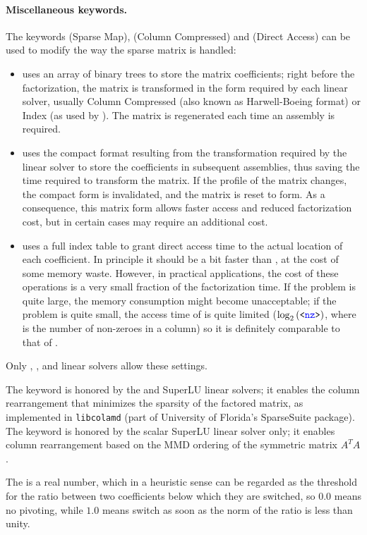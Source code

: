 \paragraph{Miscellaneous keywords.}
The keywords  (Sparse Map),  (Column Compressed)
and  (Direct Access) can be used to modify the way
the sparse matrix is handled:
\begin{itemize}
\item {} uses an array of binary trees to store the matrix
coefficients; right before the factorization, the matrix is transformed
in the form required by each linear solver, usually Column Compressed
(also known as Harwell-Boeing format) or Index (as used by ).
The matrix is regenerated each time an assembly is required.
\item {} uses the compact format resulting from the transformation
required by the linear solver to store the coefficients
in subsequent assemblies,
thus saving the time required to transform the matrix.
If the profile of the matrix changes, the compact form is invalidated,
and the matrix is reset to  form.  As a consequence, this matrix
form allows faster access and reduced factorization cost, but in certain
cases may require an additional cost.
\item {} uses a full index table to grant direct access time to
the actual location of each coefficient.
In principle it should be a bit faster than , at the cost
of some memory waste.
However, in practical applications, the cost of these operations
is a very small fraction of the factorization time.
If the problem is quite large, the memory consumption might
become unacceptable; if the problem is quite small, the access time
of  is quite limited ($\log_2\left( \texttt{<\textcolor{blue}{nz}>} \right)$, where
 is the number of non-zeroes in a column) so it is definitely
comparable to that of .
\end{itemize}
Only , ,  and 
linear solvers allow these settings.

The keyword  is honored by the  and SuperLU linear solvers;
it enables the column rearrangement that minimizes the sparsity
of the factored matrix, as implemented in \texttt{libcolamd}
(part of University of Florida's SparseSuite package).
The keyword  is honored by 
the scalar SuperLU linear solver only; it enables column rearrangement
based on the MMD ordering of the symmetric matrix $A^T A$.


The  is a real number, which in a heuristic sense 
can be regarded as the threshold for the ratio between two coefficients 
below which they are switched, so $ 0.0 $ means no pivoting, 
while $ 1.0 $ means switch as soon as the norm of the ratio 
is less than unity.

